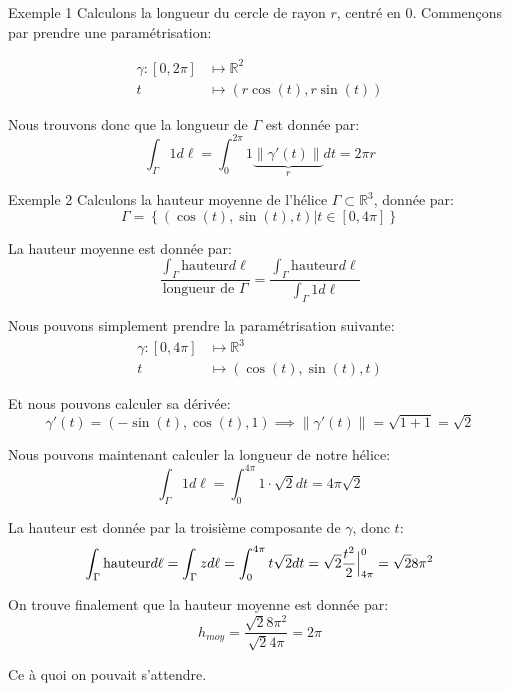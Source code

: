 \documentclass[a4paper]{article}
\begin{document}
\begin{parag}{Exemple 1}
    Calculons la longueur du cercle de rayon $r$, centré en 0. Commençons par prendre une paramétrisation:
    
    \[\begin{split}
    \gamma: \left[0, 2\pi\right] &\longmapsto \mathbb{R}^2 \\
    t &\longmapsto \left(r \cos\left(t\right), r\sin\left(t\right)\right)
    \end{split}\]
    
    Nous trouvons donc que la longueur de $\Gamma$ est donnée par: 
    \[\int_{\Gamma} 1 d \ell = \int_{0}^{2\pi} 1 \underbrace{\left\|\gamma'\left(t\right)\right\|}_{r} dt = 2\pi r\]
\end{parag}

\begin{parag}{Exemple 2}
    Calculons la hauteur moyenne de l'hélice $\Gamma \subset\mathbb{R}^3$, donnée par: 
    \[\Gamma = \left\{\left(\cos\left(t\right), \sin\left(t\right), t\right) | t \in \left[0, 4\pi\right]\right\}\]
    
    La hauteur moyenne est donnée par: 
    \[\frac{\int_{\Gamma} \text{hauteur} d \ell }{\text{longueur de $\Gamma$}} = \frac{\int_{\Gamma} \text{hauteur} d \ell}{\int_{\Gamma} 1 d \ell }\]
    
    Nous pouvons simplement prendre la paramétrisation suivante:
    \[\begin{split}
    \gamma: \left[0, 4\pi\right] &\longmapsto \mathbb{R}^3 \\
    t &\longmapsto \left(\cos\left(t\right), \sin\left(t\right), t\right)
    \end{split}\]
    
    Et nous pouvons calculer sa dérivée: 
    \[\gamma'\left(t\right) = \left(-\sin\left(t\right), \cos\left(t\right), 1\right) \implies \left\|\gamma'\left(t\right)\right\| = \sqrt{1 + 1} = \sqrt{2}\]
    
    Nous pouvons maintenant calculer la longueur de notre hélice: 
    \[\int_{\Gamma} 1 d \ell = \int_{0}^{4\pi} 1 \cdot  \sqrt{2} dt = 4\pi\sqrt{2}\]
    
    La hauteur est donnée par la troisième composante de $\gamma$, donc $t$: 
    \[\int_{\Gamma} \text{hauteur} d \ell = \int_{\Gamma} z d \ell = \int_{0}^{4\pi} t \sqrt{2} dt = \sqrt{2} \frac{t^2}{2} \Big|_{4\pi}^{0} = \sqrt{2} 8 \pi^2\]
    
    On trouve finalement que la hauteur moyenne est donnée par: 
    \[h_{moy} = \frac{\sqrt{2} 8 \pi^2}{\sqrt{2} 4 \pi} = 2\pi\]
    
    Ce à quoi on pouvait s'attendre.
\end{parag}
\end{document}
